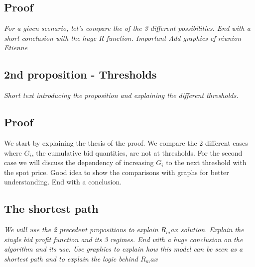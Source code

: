 \documentclass[letterpaper]{article}
\begin{document}
\subsection{Proof}
\textit{For a given scenario, let's compare the of the 3 different possibilities. End with a short conclusion with the huge R function. Important Add graphics cf réunion Etienne}
\subsection{2nd proposition - Thresholds}
\textit{Short text introducing the proposition and explaining the different thresholds.}
\subsection{Proof}
We start by explaining the thesis of the proof. We compare the 2 different cases where $G_i$, the cumulative bid quantities, are not at thresholds.
For the second case we will discuss the dependency of increasing $G_i$ to the next threshold with the spot price. Good idea to show the comparisons with graphs for better understanding. End with a conclusion.

\subsection{The shortest path}
\textit{We will use the 2 precedent propositions to explain $R_max$ solution. Explain the single bid profit function and its 3 regimes. End with a huge conclusion on the algorithm and its use. Use graphics to explain how this model can be seen as a shortest path and to explain the logic behind $R_max$}
\end{document}
